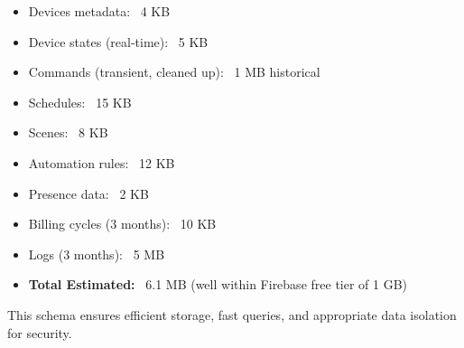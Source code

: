\begin{itemize}
    \item Devices metadata: ~4 KB
    \item Device states (real-time): ~5 KB
    \item Commands (transient, cleaned up): ~1 MB historical
    \item Schedules: ~15 KB
    \item Scenes: ~8 KB
    \item Automation rules: ~12 KB
    \item Presence data: ~2 KB
    \item Billing cycles (3 months): ~10 KB
    \item Logs (3 months): ~5 MB
    \item \textbf{Total Estimated:} ~6.1 MB (well within Firebase free tier of 1 GB)
\end{itemize}

This schema ensures efficient storage, fast queries, and appropriate data isolation for security.
